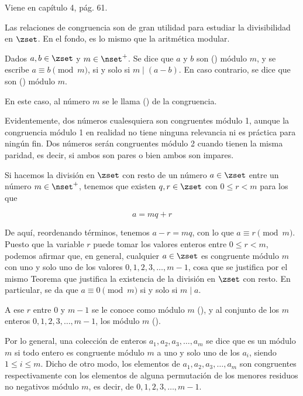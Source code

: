 


Viene en \cite{burton} capítulo 4, pág. 61.

Las relaciones de congruencia son de gran utilidad para estudiar la
divisibilidad en $\zset$. En el fondo, es lo mismo que la aritmética
modular.

\begin{deffinition}
  Dados $a, b \in \zset$ y $m \in \nset^{+}$. Se dice que $a$ y $b$ son
   () módulo $m$, y se escribe $a \equiv b
  \pmod m$, si y solo si $m \mid (a - b)$. En caso contrario, se dice que
  son  () módulo $m$.
\end{deffinition}

En este caso, al número $m$ se le llama  () de la
congruencia.

Evidentemente, dos números cualesquiera son congruentes módulo 1, aunque la
congruencia módulo 1 en realidad no tiene ninguna relevancia ni es práctica
para ningún fin. Dos números serán congruentes módulo 2 cuando tienen la
misma paridad, es decir, si ambos son pares o bien ambos son impares.

Si hacemos la división en $\zset$ con resto de un número $a \in \zset$ entre
un número $m \in \nset^{+}$, tenemos que existen $q, r \in \zset$ con $0
\leq r < m$ para los que

$$ a = mq + r $$

\noindent De aquí, reordenando términos, tenemos $a - r = mq$, con lo que $a
\equiv r \pmod m$. Puesto que la variable $r$ puede tomar los valores
enteros entre $0 \leq r < m$, podemos afirmar que, en general, cualquier $a
\in \zset$ es congruente módulo $m$ con uno y solo uno de los valores $0, 1,
2, 3, \ldots, m-1$, cosa que se justifica por el mismo Teorema que justifica
la existencia de la división en $\zset$ con resto. En particular, se da que
$a \equiv 0 \pmod m$ si y solo si $m \mid a$.

A ese $r$ entre 0 y $m-1$ se le conoce como 
módulo $m$ (), y al conjunto de
los $m$ enteros $0, 1, 2, 3, \ldots, m-1$, los  módulo $m$ ().

Por lo general, una colección de enteros $a_1, a_2, a_3, \ldots, a_m$ se
dice que es un  módulo $m$ si
todo entero es congruente módulo $m$ a uno y solo uno de los $a_i$, siendo
$1 \leq i \leq m$. Dicho de otro modo, los elementos de $a_1, a_2, a_3,
\ldots, a_m$ son congruentes respectivamente con los elementos de alguna
permutación de los menores residuos no negativos módulo $m$, es decir, de
$0, 1, 2, 3, \ldots, m-1$.

